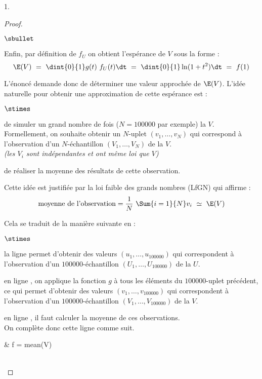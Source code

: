 \documentclass[11pt]{article}%
\begin{document}
\begin{noliste}{1.}
\begin{proof}
\begin{noliste}{$\sbullet$}


    \item Enfin, par définition de $f_U$ on obtient l'espérance de $V$
      sous la forme :
      \[
      \E(V) \ = \ \dint{0}{1} g(t) \ f_U(t) \dt \ = \ \dint{0}{1}
      \ln(1 + t^2) \dt \ = \ f(1)
      \]

    \item L'énoncé demande donc de déterminer une valeur approchée de
      $\E(V)$. L'idée naturelle pour obtenir une approximation de
      cette espérance est :
      \begin{noliste}{$\stimes$}
      \item de simuler un grand nombre de fois ($N = 100 000$ par
        exemple) la \var $V$.\\
        Formellement, on souhaite obtenir un $N$-uplet $(v_1, \ldots,
        v_N)$ qui correspond à l'observation d'un $N$-échantillon
        $(V_1, \ldots, V_N)$ de la \var $V$.\\
        {\it (les \var $V_i$ sont indépendantes et ont même loi que
          $V$)}
      \item de réaliser la moyenne des résultats de cette observation.
      \end{noliste}
      Cette idée est justifiée par la loi faible des grands nombres
      (LfGN) qui affirme :
      \[
      \mbox{moyenne de l'observation} = \dfrac{1}{N} \ \Sum{i = 1}{N}
      v_i \ \simeq \ \E(V)
      \]

    \item Cela se traduit de la manière suivante en \Scilab{} :
      \begin{noliste}{$\stimes$}
      \item la ligne  permet d'obtenir des valeurs $(u_1,
        \ldots, u_{100 000})$ qui correspondent à l'observation d'un
        $100 000$-échantillon $(U_1, \ldots, U_{100 000})$ de la \var
        $U$.

      \item en ligne , on applique la fonction $g$ à tous les
        éléments du $100 000$-uplet précédent, ce qui permet d'obtenir
        des valeurs $(v_1, \ldots, v_{100 000})$ qui correspondent à
        l'observation d'un $100 000$-échantillon $(V_1, \ldots, V_{100
          000})$ de la \var $V$.

      \item en ligne , il faut calculer la moyenne de ces
        observations.\\
        On complète donc cette ligne comme suit.
        \begin{scilabC}{2}
          & f = mean(V) %
        \end{scilabC}        
      \end{noliste}
    \end{noliste}
    ~\\[-1.2cm]
  \end{proof}
\end{noliste}
\end{document}
